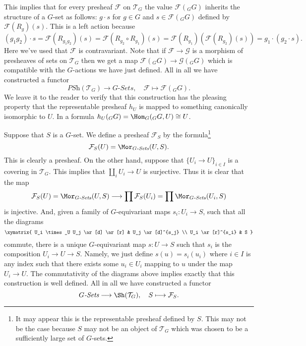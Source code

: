\medskip\noindent
This implies that for every presheaf $\mathcal{F}$ on $\mathcal{T}_G$
the value $\mathcal{F}({}_GG)$ inherits the structure of a $G$-set
as follows: $g \cdot s$ for $g \in G$ and $s \in \mathcal{F}({}_GG)$
defined by $\mathcal{F}(R_g)(s)$. This is a left action
because
$$
(g_1g_2) \cdot s  = \mathcal{F}(R_{g_1g_2})(s) =
\mathcal{F}(R_{g_2}\circ R_{g_1})(s) =
\mathcal{F}(R_{g_1})( \mathcal{F}(R_{g_2})(s)) =
g_1 \cdot (g_2 \cdot s).
$$
Here we've used that $\mathcal{F}$
is contravariant. Note that if $\mathcal{F} \to \mathcal{G}$
is a morphism of presheaves of sets on $\mathcal{T}_G$
then we get a map $\mathcal{F}({}_GG) \to \mathcal{G}({}_GG)$
which is compatible with the $G$-actions we have just defined.
All in all we have constructed a functor
$$
\textit{PSh}(\mathcal{T}_G)
\longrightarrow
G\textit{-Sets}, \quad
\mathcal{F}
\longmapsto
\mathcal{F}({}_GG).
$$
We leave it to the reader to verify that this construction
has the pleasing property that the representable presheaf
$h_U$ is mapped to something canonically isomorphic to $U$.
In a formula $h_U({}_GG) = \Hom_G({}_GG, U) \cong U$.

\medskip\noindent
Suppose that $S$ is a $G$-set. We define a presheaf
$\mathcal{F}_S$ by the formula\footnote{It may appear this is the
representable presheaf defined by $S$. This may not be the case
because $S$ may not be an object of $\mathcal{T}_G$ which was chosen
to be a sufficiently large set of $G$-sets.}
$$
\mathcal{F}_S(U)
=
\Mor_{G\textit{-Sets}}(U, S).
$$
This is clearly a presheaf. On the other hand, suppose that
$\{U_i \to U\}_{i\in I}$ is a covering in $\mathcal{T}_G$.
This implies that $\coprod_i U_i \to U$ is surjective. Thus it is
clear that the map
$$
\mathcal{F}_S(U)
=
\Mor_{G\textit{-Sets}}(U, S)
\longrightarrow
\prod \mathcal{F}_S(U_i)
=
\prod \Mor_{G\textit{-Sets}}(U_i, S)
$$
is injective. And, given a family of $G$-equivariant
maps $s_i : U_i \to S$, such that all the diagrams
$$
\xymatrix{
U_i \times_U U_j \ar[d] \ar[r]
&
U_j \ar[d]^{s_j}
\\
U_i \ar[r]^{s_i}
&
S
}
$$
commute, there is a unique $G$-equivariant map
$s : U \to S$ such that $s_i$ is the composition
$U_i \to U \to S$. Namely, we just define $s(u) = s_i(u_i)$
where $i\in I$ is any index such that there exists some
$u_i \in U_i$ mapping to $u$ under the map $U_i \to U$.
The commutativity of the diagrams above implies exactly
that this construction is well defined. All in all we have
constructed a functor
$$
G\textit{-Sets}
\longrightarrow
\Sh(\mathcal{T}_G), \quad
S
\longmapsto
\mathcal{F}_S
.
$$

